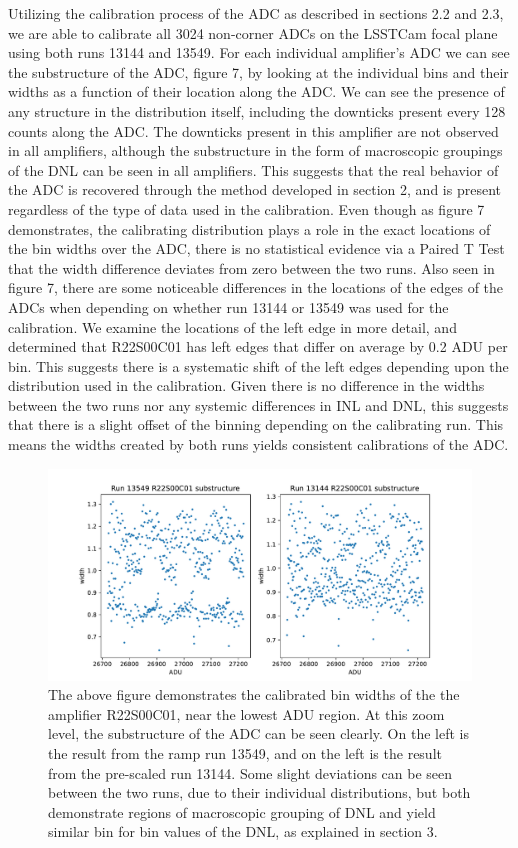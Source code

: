 \documentclass[11pt, letterpaper]{article}
\begin{document}
Utilizing the calibration process of the ADC as described in sections 2.2 and 2.3, we are able to calibrate all 3024 non-corner ADCs on the LSSTCam focal plane using both runs 13144 and 13549. 
For each individual amplifier’s ADC we can see the substructure of the ADC, figure 7, by looking at the individual bins and their widths as a function of their location along the ADC. 
We can see the presence of any structure in the distribution itself, including the downticks present every 128 counts along the ADC. 
The downticks present in this amplifier are not observed in all amplifiers, although the substructure in the form of macroscopic groupings of the DNL can be seen in all amplifiers.
This suggests that the real behavior of the ADC is recovered through the method developed in section 2, and is present regardless of the type of data used in the calibration.
Even though as figure 7 demonstrates, the calibrating distribution plays a role in the exact locations of the bin widths over the ADC, there is no statistical evidence via a Paired T Test that the width difference deviates from zero between the two runs.  
Also seen in figure 7, there are some noticeable differences in the locations of the edges of the ADCs when depending on whether run 13144 or 13549 was used for the calibration.
We examine the locations of the left edge in more detail, and determined that R22S00C01 has left edges that differ on average by 0.2 ADU per bin. 
This suggests there is a systematic shift of the left edges depending upon the distribution used in the calibration.
Given there is no difference in the widths between the two runs nor any systemic differences in INL and DNL, this suggests that there is a slight offset of the binning depending on the calibrating run.
This means the widths created by both runs yields consistent calibrations of the ADC. 

\begin{figure}
    \centering
    \includegraphics[width=0.5\linewidth]{substructure.pdf}
    \caption{The above figure demonstrates the calibrated bin widths of the the amplifier R22S00C01, near the lowest ADU region. At this zoom level, the substructure of the ADC can be seen clearly. On the left is the result from the ramp run 13549, and on the left is the result from the pre-scaled run 13144.  Some slight deviations can be seen between the two runs, due to their individual distributions, but both demonstrate regions of macroscopic grouping of DNL and yield similar bin for bin values of the DNL, as explained in section 3.}
    \label{fig:enter-label}
\end{figure}
\end{document}

